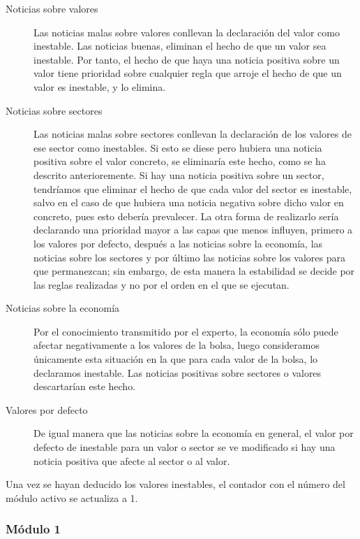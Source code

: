 \documentclass[11pt,leqno]{article}
\theoremstyle{definition_wo_parentheses}
\theoremstyle{plain}
\theoremstyle{remark}
\begin{document}
	\begin{description}
	\item[Noticias sobre valores] Las noticias malas sobre valores conllevan la declaración del valor como inestable. Las noticias buenas, eliminan el hecho de que un valor sea inestable. Por tanto, el hecho de que haya una noticia positiva sobre un valor tiene prioridad sobre cualquier regla que arroje el hecho de que un valor es inestable, y lo elimina.
	
	\item[Noticias sobre sectores] Las noticias malas sobre sectores conllevan la declaración de los valores de ese sector como inestables. Si esto se diese pero hubiera una noticia positiva sobre el valor concreto, se eliminaría este hecho, como se ha descrito anterioremente. Si hay una noticia positiva sobre un sector, tendríamos que eliminar el hecho de que cada valor del sector es inestable, salvo en el caso de que hubiera una noticia negativa sobre dicho valor en concreto, pues esto debería prevalecer. La otra forma de realizarlo sería declarando una prioridad mayor a las capas que menos influyen, primero a los valores por defecto, después a las noticias sobre la economía, las noticias sobre los sectores y por último las noticias sobre los valores para que permanezcan; sin embargo, de esta manera la estabilidad se decide por las reglas realizadas y no por el orden en el que se ejecutan.
	
	\item[Noticias sobre la economía] Por el conocimiento transmitido por el experto, la economía sólo puede afectar negativamente a los valores de la bolsa, luego consideramos únicamente esta situación en la que para cada valor de la bolsa, lo declaramos inestable. Las noticias positivas sobre sectores o valores descartarían este hecho.
	
	\item[Valores por defecto] De igual manera que las noticias sobre la economía en general, el valor por defecto de inestable para un valor o sector se ve modificado si hay una noticia positiva que afecte al sector o al valor.	
	\end{description}
	
	Una vez se hayan deducido los valores inestables, el contador con el número del módulo activo se actualiza a 1.
	
\subsubsection{Módulo 1}
\end{document}

